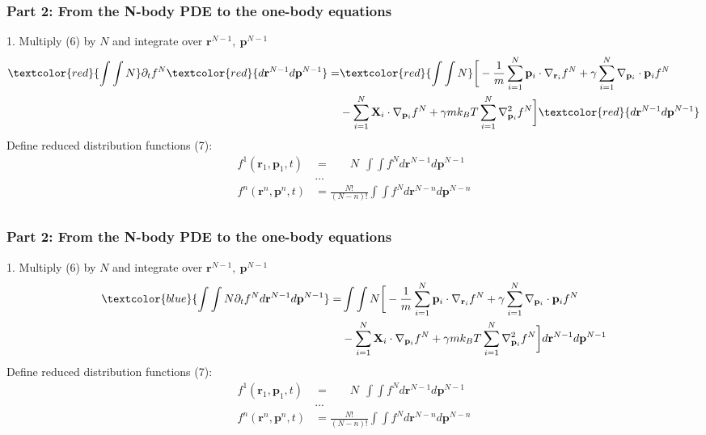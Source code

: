 \documentclass[aspectratio=169,xcolor=dvipsnames]{beamer}
\begin{document}
\begin{frame}
	\frametitle{Part 2: From the N-body PDE to the one-body equations}
	1. Multiply (6) by $N$ and integrate over $\mathbf{r}^{N-1}, \ \mathbf{p}^{N-1}$
	\begin{align*}
	 \textcolor{red}{\int \int N }\partial_t f^N  \textcolor{red}{d \mathbf{r}^{N-1} d\mathbf{p}^{N-1}} = & \textcolor{red}{\int \int N} \bigg[ - \frac{1}{m} \sum_{i=1}^N \mathbf{p}_i \cdot \nabla_{\mathbf{r}_i} f^N + \gamma \sum_{i = 1}^N \nabla_{\mathbf{p}_i}
	\cdot \mathbf{p}_i f^N \\
	&- \sum_{i=1}^N \mathbf{X}_i \cdot \nabla_{\mathbf{p}_i}f^N + \gamma m k_BT \sum_{i=1}^N \nabla^2_{\mathbf{p}_i}f^N \bigg] \textcolor{red}{d \mathbf{r}^{N-1} d \mathbf{p}^{N-1}	}
	\end{align*}
	Define reduced distribution functions (7):
	\begin{align*}
	f^1(\mathbf{r}_1,\mathbf{p}_1,t) &= \ \ \ \ \ \ \  \ N \ \ \int \int f^N d\mathbf{r}^{N-1} d\mathbf{p}^{N-1}\\
	&...\\
	f^n(\mathbf{r}^n,\mathbf{p}^n,t) &= \frac{N!}{(N-n)!} \int \int f^N d\mathbf{r}^{N-n} d\mathbf{p}^{N-n}\\
	\end{align*}
\end{frame}
\begin{frame}
	\frametitle{Part 2: From the N-body PDE to the one-body equations}
	1. Multiply (6) by $N$ and integrate over $\mathbf{r}^{N-1}, \ \mathbf{p}^{N-1}$
	\begin{align*}
	\textcolor{blue}{\int \int N \partial_t f^N d \mathbf{r}^{N-1} d\mathbf{p}^{N-1}} = &\int \int N \bigg[ - \frac{1}{m} \sum_{i=1}^N \mathbf{p}_i \cdot \nabla_{\mathbf{r}_i} f^N + \gamma \sum_{i = 1}^N \nabla_{\mathbf{p}_i}
	\cdot \mathbf{p}_i f^N \\
	&- \sum_{i=1}^N \mathbf{X}_i \cdot \nabla_{\mathbf{p}_i}f^N + \gamma m k_BT \sum_{i=1}^N \nabla^2_{\mathbf{p}_i}f^N \bigg]d \mathbf{r}^{N-1} d \mathbf{p}^{N-1}	
	\end{align*}
	 Define reduced distribution functions (7):
	\begin{align*}
	f^1(\mathbf{r}_1,\mathbf{p}_1,t) &= \ \ \ \ \ \ \  \ N \ \ \int \int f^N d\mathbf{r}^{N-1} d\mathbf{p}^{N-1}\\
	&...\\
	f^n(\mathbf{r}^n,\mathbf{p}^n,t) &= \frac{N!}{(N-n)!} \int \int f^N d\mathbf{r}^{N-n} d\mathbf{p}^{N-n}\\
	\end{align*}
\end{frame}
\end{document}
